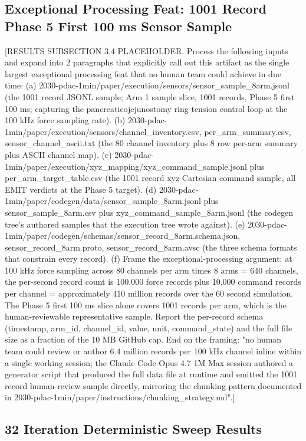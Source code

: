 \subsection{Exceptional Processing Feat: 1001 Record Phase 5 First 100 ms Sensor Sample}
\label{sec:results-feat}

[RESULTS SUBSECTION 3.4 PLACEHOLDER. Process the following inputs and expand into 2 paragraphs that explicitly call out this artifact as the single largest exceptional processing feat that no human team could achieve in due time:
(a) 2030-pdac-1min/paper/execution/sensors/sensor_sample_8arm.jsonl (the 1001 record JSONL sample; Arm 1 sample slice, 1001 records, Phase 5 first 100 ms; capturing the pancreaticojejunostomy ring tension control loop at the 100 kHz force sampling rate).
(b) 2030-pdac-1min/paper/execution/sensors/{channel_inventory.csv, per_arm_summary.csv, sensor_channel_ascii.txt} (the 80 channel inventory plus 8 row per-arm summary plus ASCII channel map).
(c) 2030-pdac-1min/paper/execution/xyz_mapping/xyz_command_sample.jsonl plus per_arm_target_table.csv (the 1001 record xyz Cartesian command sample, all EMIT verdicts at the Phase 5 target).
(d) 2030-pdac-1min/paper/codegen/data/sensor_sample_8arm.jsonl plus sensor_sample_8arm.csv plus xyz_command_sample_8arm.jsonl (the codegen tree's authored samples that the execution tree wrote against).
(e) 2030-pdac-1min/paper/codegen/schemas/{sensor_record_8arm.schema.json, sensor_record_8arm.proto, sensor_record_8arm.avsc} (the three schema formats that constrain every record).
(f) Frame the exceptional-processing argument: at 100 kHz force sampling across 80 channels per arm times 8 arms = 640 channels, the per-second record count is 100,000 force records plus 10,000 command records per channel = approximately 410 million records over the 60 second simulation. The Phase 5 first 100 ms slice alone covers 1001 records per arm, which is the human-reviewable representative sample. Report the per-record schema (timestamp, arm_id, channel_id, value, unit, command_state) and the full file size as a fraction of the 10 MB GitHub cap.
End on the framing: "no human team could review or author 6.4 million records per 100 kHz channel inline within a single working session; the Claude Code Opus 4.7 1M Max session authored a generator script that produced the full data file at runtime and emitted the 1001 record human-review sample directly, mirroring the chunking pattern documented in 2030-pdac-1min/paper/instructions/chunking_strategy.md".]

\subsection{32 Iteration Deterministic Sweep Results}
\label{sec:results-iterations}

